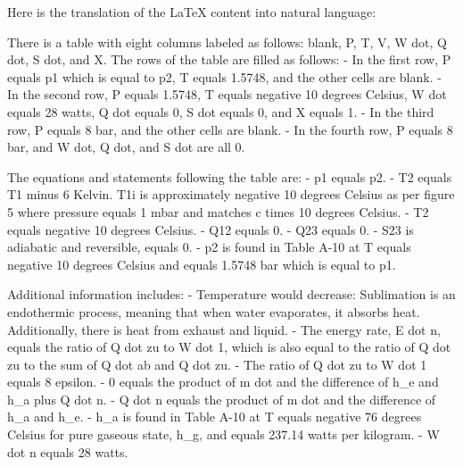 Here is the translation of the LaTeX content into natural language:

There is a table with eight columns labeled as follows: blank, P, T, V, W dot, Q dot, S dot, and X. The rows of the table are filled as follows:
- In the first row, P equals p1 which is equal to p2, T equals 1.5748, and the other cells are blank.
- In the second row, P equals 1.5748, T equals negative 10 degrees Celsius, W dot equals 28 watts, Q dot equals 0, S dot equals 0, and X equals 1.
- In the third row, P equals 8 bar, and the other cells are blank.
- In the fourth row, P equals 8 bar, and W dot, Q dot, and S dot are all 0.

The equations and statements following the table are:
- p1 equals p2.
- T2 equals T1 minus 6 Kelvin. T1i is approximately negative 10 degrees Celsius as per figure 5 where pressure equals 1 mbar and matches c times 10 degrees Celsius.
- T2 equals negative 10 degrees Celsius.
- Q12 equals 0.
- Q23 equals 0.
- S23 is adiabatic and reversible, equals 0.
- p2 is found in Table A-10 at T equals negative 10 degrees Celsius and equals 1.5748 bar which is equal to p1.

Additional information includes:
- Temperature would decrease: Sublimation is an endothermic process, meaning that when water evaporates, it absorbs heat. Additionally, there is heat from exhaust and liquid.
- The energy rate, E dot n, equals the ratio of Q dot zu to W dot 1, which is also equal to the ratio of Q dot zu to the sum of Q dot ab and Q dot zu.
- The ratio of Q dot zu to W dot 1 equals 8 epsilon.
- 0 equals the product of m dot and the difference of h_e and h_a plus Q dot n.
- Q dot n equals the product of m dot and the difference of h_a and h_e.
- h_a is found in Table A-10 at T equals negative 76 degrees Celsius for pure gaseous state, h_g, and equals 237.14 watts per kilogram.
- W dot n equals 28 watts.